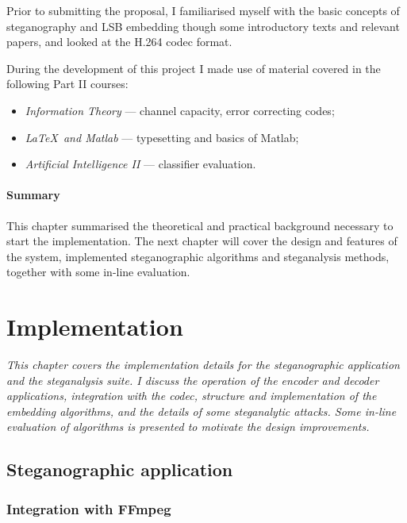 \documentclass[12pt,british,twoside,notitlepage,usenames,dvipsnames,hypens,final]{report}
\numberwithin{equation}{section}
\numberwithin{figure}{section}
\begin{document}
Prior to submitting the proposal, I familiarised myself with the basic concepts of steganography and LSB embedding though some introductory texts and relevant papers, and looked at the H.264 codec format.

During the development of this project I made use of material covered in the following Part II courses:
\begin{itemize}
\item \textit{Information Theory} --- channel capacity, error correcting codes;
\item \textit{\LaTeX~and Matlab} --- typesetting and basics of Matlab;
\item \textit{Artificial Intelligence II} --- classifier evaluation.
\end{itemize}

\bigskip
\subsubsection*{Summary}
This chapter summarised the theoretical and practical background necessary to start the implementation. The next chapter will cover the design and features of the system, implemented steganographic algorithms and steganalysis methods, together with some in-line evaluation.

\cleardoublepage
\chapter{Implementation}

\textit{This chapter covers the implementation details for the steganographic application and the steganalysis suite. I discuss the operation of the encoder and decoder applications, integration with the codec, structure and implementation of the embedding algorithms, and the details of some steganalytic attacks. Some in-line evaluation of algorithms is presented to motivate the design improvements.}

\section{Steganographic application}

\subsection{Integration with FFmpeg}
\label{integrate-ffmpeg}
\end{document}
